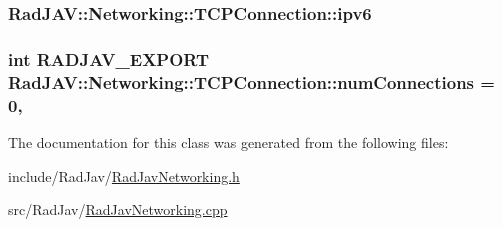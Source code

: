 \subsubsection[{\texorpdfstring{ipv6}{ipv6}}]{ Rad\+J\+A\+V\+::\+Networking\+::\+T\+C\+P\+Connection\+::ipv6\hspace{0.3cm}{\ttfamily [protected]}}\hypertarget{class_rad_j_a_v_1_1_networking_1_1_t_c_p_connection_a3ddda74035ec41a86c9431c084cd0097}{}\label{class_rad_j_a_v_1_1_networking_1_1_t_c_p_connection_a3ddda74035ec41a86c9431c084cd0097}
\subsubsection[{\texorpdfstring{num\+Connections}{numConnections}}]{\setlength{\rightskip}{0pt plus 5cm}int R\+A\+D\+J\+A\+V\+\_\+\+E\+X\+P\+O\+RT Rad\+J\+A\+V\+::\+Networking\+::\+T\+C\+P\+Connection\+::num\+Connections = 0\hspace{0.3cm}{\ttfamily [static]}, {\ttfamily [protected]}}\hypertarget{class_rad_j_a_v_1_1_networking_1_1_t_c_p_connection_a342f7c52a3e4c2567b8263f68109ffcb}{}\label{class_rad_j_a_v_1_1_networking_1_1_t_c_p_connection_a342f7c52a3e4c2567b8263f68109ffcb}


The documentation for this class was generated from the following files\+:\begin{DoxyCompactItemize}
\item 
include/\+Rad\+Jav/\hyperlink{_rad_jav_networking_8h}{Rad\+Jav\+Networking.\+h}\item 
src/\+Rad\+Jav/\hyperlink{_rad_jav_networking_8cpp}{Rad\+Jav\+Networking.\+cpp}\end{DoxyCompactItemize}
